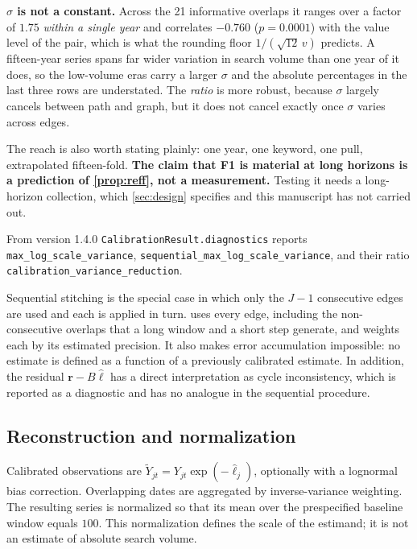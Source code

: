 \documentclass[12pt,a4paper,oneside]{article}
\begin{document}
\begin{remark}
\begin{remark}
\textbf{$\sigma$ is not a constant.} Across the 21 informative overlaps it ranges
over a factor of $1.75$ \emph{within a single year} and correlates $-0.760$
($p=0.0001$) with the value level of the pair, which is what the rounding floor
$1/(\sqrt{12}\,v)$ predicts. A fifteen-year series spans far wider variation in
search volume than one year of it does, so the low-volume eras carry a larger
$\sigma$ and the absolute percentages in the last three rows are understated. The
\emph{ratio} is more robust, because $\sigma$ largely cancels between path and
graph, but it does not cancel exactly once $\sigma$ varies across edges.

The reach is also worth stating plainly: one year, one keyword, one pull,
extrapolated fifteen-fold. \textbf{The claim that F1 is material at long horizons
is a prediction of \cref{prop:reff}, not a measurement.} Testing it needs a
long-horizon collection, which \cref{sec:design} specifies and this
manuscript has not carried out.
\end{remark}

From version 1.4.0 \texttt{CalibrationResult.diagnostics} reports
\texttt{max\_\allowbreak log\_\allowbreak scale\_\allowbreak variance},
\texttt{sequential\_\allowbreak max\_\allowbreak log\_\allowbreak scale\_\allowbreak variance},
and their ratio
\texttt{calibration\_\allowbreak variance\_\allowbreak reduction}.
\end{remark}

\begin{remark}
Sequential stitching is the special case in which only the $J-1$ consecutive
edges are used and each is applied in turn.  uses every edge,
including the non-consecutive overlaps that a long window and a short step
generate, and weights each by its estimated precision. It also makes error
accumulation impossible: no estimate is defined as a function of a previously
calibrated estimate. In addition, the residual $\bm{r} - B\hat{\bm{\ell}}$ has a
direct interpretation as cycle inconsistency, which is reported as a diagnostic
and has no analogue in the sequential procedure.
\end{remark}

\subsection{Reconstruction and normalization}

Calibrated observations are $\tilde{Y}_{jt} = Y_{jt}\exp(-\hat{\ell}_j)$,
optionally with a lognormal bias correction. Overlapping dates are aggregated by
inverse-variance weighting. The resulting series is normalized so that its mean
over the prespecified baseline window equals $100$. This normalization defines
the scale of the estimand; it is not an estimate of absolute search volume.
\end{document}
